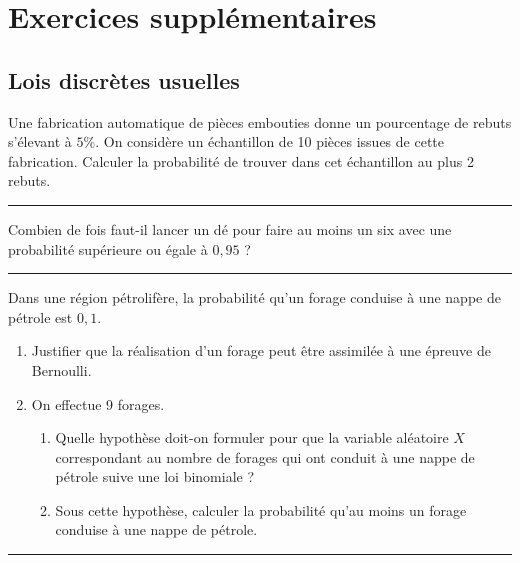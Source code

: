 \documentclass[../PolyS4.tex]{subfiles}
\begin{document}
\setcounter{chapter}{4}
\chapter{Exercices supplémentaires}

\section{Lois discrètes usuelles}



Une fabrication automatique de pièces embouties donne un pourcentage de rebuts s'élevant à $5\%$. On considère un échantillon de 10 pièces issues de cette fabrication. Calculer la probabilité
de trouver dans cet échantillon au plus 2 rebuts.\\

\hfill\break
\hrule
\hfill\break


Combien de fois faut-il lancer un dé pour faire au moins un six avec une probabilité
supérieure ou égale à $0,95$ ?\\

\hfill\break
\hrule
\hfill\break


Dans une région pétrolifère, la probabilité qu'un forage conduise à une nappe de pétrole est $0,1$.
\begin{enumerate}
\item Justifier que la réalisation d'un forage peut être assimilée à une épreuve de Bernoulli.
\item  On effectue 9 forages.
\begin{enumerate}
\item Quelle hypothèse doit-on formuler pour que la variable aléatoire $X$ correspondant au nombre de forages qui ont conduit à une nappe de pétrole suive une loi binomiale ?
\item Sous cette hypothèse, calculer la probabilité qu'au moins un forage conduise à une nappe de
pétrole.\\
\end{enumerate}
\end{enumerate}



\hfill\break
\hrule
\hfill\break

\newpage

\end{document}
